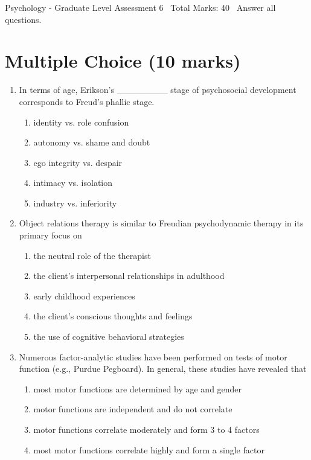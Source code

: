 \documentclass[12pt]{article}
\begin{document}
\begin{center}
Psychology - Graduate Level Assessment 6 \
Total Marks: 40 \
Answer all questions.
\end{center}

\section*{Multiple Choice (10 marks)}
\begin{enumerate}[label=\arabic*.]
\item In terms of age, Erikson's \_\_\_\_\_\_\_\_ stage of psychosocial development corresponds to Freud's phallic stage.
\begin{enumerate}[label=(\alph*)]
    \item identity vs. role confusion
    \item autonomy vs. shame and doubt
    \item ego integrity vs. despair
    \item intimacy vs. isolation
    \item industry vs. inferiority
\end{enumerate}
\item Object relations therapy is similar to Freudian psychodynamic therapy in its primary focus on
\begin{enumerate}[label=(\alph*)]
    \item the neutral role of the therapist
    \item the client's interpersonal relationships in adulthood
    \item early childhood experiences
    \item the client's conscious thoughts and feelings
    \item the use of cognitive behavioral strategies
\end{enumerate}
\item Numerous factor-analytic studies have been performed on tests of motor function (e.g., Purdue Pegboard). In general, these studies have revealed that
\begin{enumerate}[label=(\alph*)]
    \item most motor functions are determined by age and gender
    \item motor functions are independent and do not correlate
    \item motor functions correlate moderately and form 3 to 4 factors
    \item most motor functions correlate highly and form a single factor

\end{enumerate}
\end{enumerate}
\end{document}
